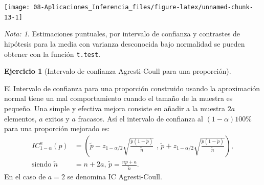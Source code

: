 \documentclass[
]{book}
\newenvironment{Shaded}{\begin{snugshade}}{\end{snugshade}}
\newcommand{\AttributeTok}[1]{\textcolor[rgb]{0.77,0.63,0.00}{#1}}
\newcommand{\CommentTok}[1]{\textcolor[rgb]{0.56,0.35,0.01}{\textit{#1}}}
\newcommand{\DecValTok}[1]{\textcolor[rgb]{0.00,0.00,0.81}{#1}}
\newcommand{\DocumentationTok}[1]{\textcolor[rgb]{0.56,0.35,0.01}{\textbf{\textit{#1}}}}
\newcommand{\FunctionTok}[1]{\textcolor[rgb]{0.00,0.00,0.00}{#1}}
\newcommand{\NormalTok}[1]{#1}
\newcommand{\OtherTok}[1]{\textcolor[rgb]{0.56,0.35,0.01}{#1}}
\newcommand{\SpecialCharTok}[1]{\textcolor[rgb]{0.00,0.00,0.00}{#1}}
\newcommand{\StringTok}[1]{\textcolor[rgb]{0.31,0.60,0.02}{#1}}
\theoremstyle{break}
\theoremstyle{definition}
\theoremstyle{definition}
\theoremstyle{definition}
\newtheorem{exercise}{Ejercicio}[chapter]
\theoremstyle{definition}
\theoremstyle{remark}
\newtheorem*{remark}{Nota: }
\begin{document}
\begin{Shaded}
\end{Shaded}

\begin{center}\texttt{[image: 08-Aplicaciones\_Inferencia\_files/figure-latex/unnamed-chunk-13-1]} \end{center}

\begin{remark}
{}Estimaciones puntuales, por intervalo de confianza y contrastes de hipótesis
para la media con varianza desconocida bajo normalidad
se pueden obtener con la función \texttt{t.test}.
\end{remark}

\vspace{0.5cm}

\begin{exercise}[Intervalo de confianza Agresti-Coull para una proporción]
\protect\hypertarget{exr:ic-agresti-coull}{}{\label{exr:ic-agresti-coull} {} }
\end{exercise}

El Intervalo de confianza para una proporción construido usando la
aproximación normal tiene un mal comportamiento cuando el tamaño de
la muestra es pequeño. Una simple y efectiva mejora consiste en
añadir a la muestra \(2a\) elementos, \(a\) exitos y \(a\) fracasos. Así
el intervalo de confianza al \(\left( 1-\alpha\right) 100\%\) para
una proporción mejorado es:
\[\begin{aligned}
IC_{1-\alpha}^{a}\left(  p\right)   
& =\left(  \tilde{p}-z_{1-\alpha/2}\sqrt{\frac{\tilde{p}(1-\tilde{p})}{\tilde{n}}} \text{ , }
\tilde{p}+z_{1-\alpha/2}\sqrt{\frac{\tilde{p}(1-\tilde{p})}{\tilde{n}}}\right)  ,\\
\text{siendo }\tilde{n} & = n+2a \text{, } \tilde{p} = \frac{np+a}{\tilde{n}}.
\end{aligned}\]
En el caso de \(a=2\) se denomina IC Agresti-Coull.
\end{document}
